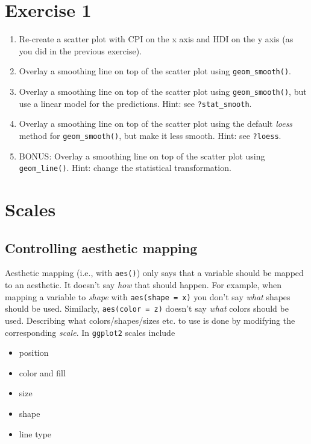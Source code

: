 \documentclass[]{book}
\providecommand{\tightlist}{%
  \setlength{\itemsep}{0pt}\setlength{\parskip}{0pt}}
\begin{document}
\section{Exercise 1}\label{exercise-1-2}

\begin{enumerate}
\def\labelenumi{\arabic{enumi}.}
\tightlist
\item
  Re-create a scatter plot with CPI on the x axis and HDI on the y axis
  (as you did in the previous exercise).
\item
  Overlay a smoothing line on top of the scatter plot using
  \texttt{geom\_smooth()}.
\item
  Overlay a smoothing line on top of the scatter plot using
  \texttt{geom\_smooth()}, but use a linear model for the predictions.
  Hint: see \texttt{?stat\_smooth}.
\item
  Overlay a smoothing line on top of the scatter plot using the default
  \emph{loess} method for \texttt{geom\_smooth()}, but make it less
  smooth. Hint: see \texttt{?loess}.
\item
  BONUS: Overlay a smoothing line on top of the scatter plot using
  \texttt{geom\_line()}. Hint: change the statistical transformation.
\end{enumerate}

\section{Scales}\label{scales}

\subsection{Controlling aesthetic
mapping}\label{controlling-aesthetic-mapping}

Aesthetic mapping (i.e., with \texttt{aes()}) only says that a variable
should be mapped to an aesthetic. It doesn't say \emph{how} that should
happen. For example, when mapping a variable to \emph{shape} with
\texttt{aes(shape\ =\ x)} you don't say \emph{what} shapes should be
used. Similarly, \texttt{aes(color\ =\ z)} doesn't say \emph{what}
colors should be used. Describing what colors/shapes/sizes etc. to use
is done by modifying the corresponding \emph{scale}. In \texttt{ggplot2}
scales include

\begin{itemize}
\tightlist
\item
  position
\item
  color and fill
\item
  size
\item
  shape
\item
  line type
\end{itemize}
\end{document}
